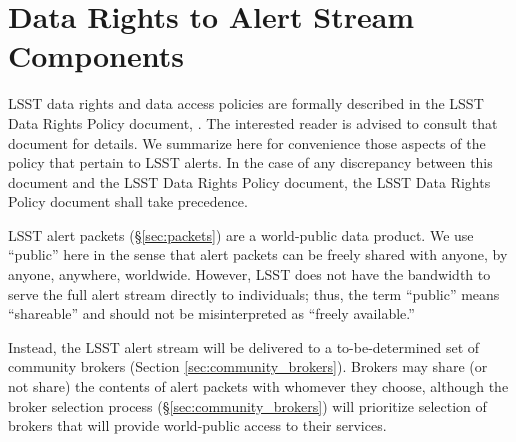 \section{Data Rights to Alert Stream Components}\label{sec:data_rights}

LSST data rights and data access policies are formally described in the LSST Data Rights Policy document, .
The interested reader is advised to consult that document for details.
We summarize here for convenience those aspects of the policy that pertain to LSST alerts.
In the case of any discrepancy between this document and the LSST Data Rights Policy document, the LSST Data Rights Policy document shall take precedence.

LSST alert packets (\S \ref{sec:packets}) are a world-public data product.
We use ``public'' here in the sense that alert packets can be freely shared with anyone, by anyone, anywhere, worldwide.
However, LSST does not have the bandwidth to serve the full alert stream directly to individuals; thus, the term ``public'' means ``shareable'' and should not be misinterpreted as ``freely available.''

Instead, the LSST alert stream will be delivered to a to-be-determined set of community brokers (Section \ref{sec:community_brokers}).
Brokers may share (or not share) the contents of alert packets with whomever they choose, although the broker selection process (\S \ref{sec:community_brokers}) will prioritize selection of brokers that will provide world-public access to their services.

